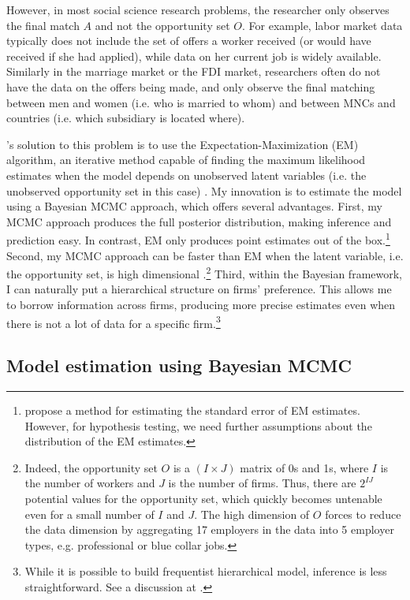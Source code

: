 However, in most social science research problems, the researcher only observes
the final match $A$ and not the opportunity set $O$. For example, labor market
data typically does not include the set of offers a worker received (or would
have received if she had applied), while data on her current job is widely
available. Similarly in the marriage market or the FDI market, researchers often
do not have the data on the offers being made, and only observe the final
matching between men and women (i.e. who is married to whom) and between MNCs
and countries (i.e. which subsidiary is located where).

\citet{Logan1998}'s solution to this problem is to use the
Expectation-Maximization (EM) algorithm, an iterative method capable of finding
the maximum likelihood estimates when the model depends on unobserved latent
variables (i.e. the unobserved opportunity set in this case)
\citep{Dempster1977}. My innovation is to estimate the model using a Bayesian
MCMC approach, which offers several advantages. First, my MCMC approach
produces the full posterior distribution, making inference and prediction easy.
In contrast, EM only produces point estimates out of the
box.\footnote{\citet{Jamshidian2000} propose a method for estimating the
  standard error of EM estimates. However, for hypothesis testing, we need
  further assumptions about the distribution of the EM estimates.} Second, my
MCMC approach can be faster than EM when the latent variable, i.e. the
opportunity set, is high dimensional \citep{Ryden2008}.\footnote{Indeed, the
  opportunity set $O$ is a $(I \times J)$ matrix of 0s and 1s, where $I$ is the
  number of workers and $J$ is the number of firms. Thus, there are $2^{IJ}$
  potential values for the opportunity set, which quickly becomes untenable even
  for a small number of $I$ and $J$. The high dimension of $O$ forces
  \citet{Logan1998} to reduce the data dimension by aggregating 17 employers in
  the data into 5 employer types, e.g. professional or blue collar jobs.} Third,
within the Bayesian framework, I can naturally put a hierarchical structure on
firms' preference. This allows me to borrow information across firms, producing
more precise estimates even when there is not a lot of data for a specific
firm.\footnote{While it is possible to build frequentist hierarchical model,
  inference is less straightforward. See a discussion at \citet{Hornik2017}.}

\subsection{Model estimation using Bayesian MCMC}

